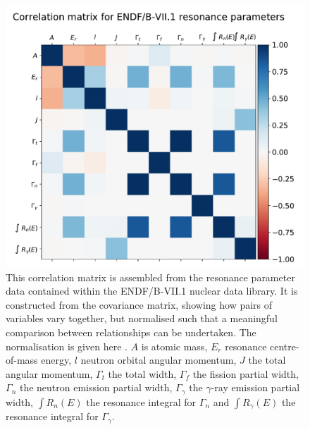 \begin{figure}[H]
  \centering
  \includegraphics[width=\linewidth]{res_correlation}
  \caption{This correlation matrix is assembled from the resonance parameter data contained within the ENDF/B-VII.1 nuclear data library. It is constructed from the covariance matrix, showing how pairs of variables vary together, but normalised such that a meaningful comparison between relationships can be undertaken. The normalisation is given here \cite{numpy2018}. $A$ is atomic mass, $E_{r}$ resonance centre-of-mass energy, $l$ neutron orbital angular momentum, $J$ the total angular momentum, $\Gamma_{t}$ the total width, $\Gamma_{f}$ the fission partial width, $\Gamma_{n}$ the neutron emission partial width, $\Gamma_{\gamma}$ the $\gamma$-ray emission partial width, $\int R_{n}(E)$ the resonance integral for $\Gamma_{n}$ and $\int R_{\gamma}(E)$ the resonance integral for $\Gamma_{\gamma}$.}
  \label{fig:res_correlation}
\end{figure}



